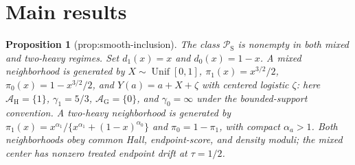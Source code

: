 \documentclass{article}
\newtheorem{proposition}{Proposition}
\begin{document}
\section{Main results}

\begin{proposition}[prop:smooth-inclusion]\label{prop:smooth-inclusion}
The class \(\mathcal P_{\mathrm S}\) is nonempty in both mixed and two-heavy regimes. Set \(d_1(x)=x\) and \(d_0(x)=1-x\). A mixed neighborhood is generated by \(X\sim\operatorname{Unif}[0,1]\), \(\pi_1(x)=x^{3/2}/2\), \(\pi_0(x)=1-x^{3/2}/2\), and \(Y(a)=a+X+\zeta\) with centered logistic \(\zeta\): here \(\mathcal A_{\mathrm H}=\{1\}\), \(\gamma_1=5/3\), \(\mathcal A_{\mathrm G}=\{0\}\), and \(\gamma_0=\infty\) under the bounded-support convention. A two-heavy neighborhood is generated by \(\pi_1(x)=x^{\alpha_1}/\{x^{\alpha_1}+(1-x)^{\alpha_0}\}\) and \(\pi_0=1-\pi_1\), with compact \(\alpha_a>1\). Both neighborhoods obey common Hall, endpoint-score, and density moduli; the mixed center has nonzero treated endpoint drift at \(\tau=1/2\).
\end{proposition}
\end{document}
